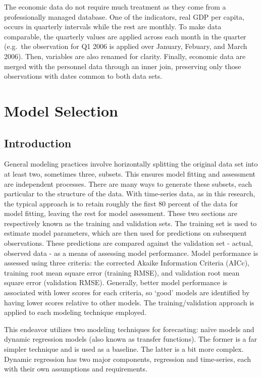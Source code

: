 \documentclass[12pt,letterpaper,toc=flat,oneside]{report}
\theoremstyle{definition}
\theoremstyle{definition}
\theoremstyle{definition}
\theoremstyle{remark}
\begin{document}
The economic data do not require much treatment as they come from a
professionally managed database. One of the indicators, real GDP per
capita, occurs in quarterly intervals while the rest are monthly. To
make data comparable, the quarterly values are applied across each month
in the quarter (e.g.~the observation for Q1 2006 is applied over
January, Febuary, and March 2006). Then, variables are also renamed for
clarity. Finally, economic data are merged with the personnel data
through an inner join, preserving only those observations with dates
common to both data sets.

\hypertarget{model-selection}{%
\section{Model Selection}\label{model-selection}}

\hypertarget{introduction-2}{%
\subsection{Introduction}\label{introduction-2}}

General modeling practices involve horizontally splitting the original
data set into at least two, sometimes three, subsets. This ensures model
fitting and assessment are independent processes. There are many ways to
generate these subsets, each particular to the structure of the data.
With time-series data, as in this research, the typical approach is to
retain roughly the first 80 percent of the data for model fitting,
leaving the rest for model assessment. These two sections are
respectively known as the training and validation sets. The training set
is used to estimate model parameters, which are then used for
predictions on subsequent observations. These predictions are compared
against the validation set - actual, observed data - as a means of
assessing model performance. Model performance is assessed using three
criteria: the corrected Akaike Information Criteria (AICc), training
root mean square error (training RMSE), and validation root mean square
error (validation RMSE). Generally, better model performance is
associated with lower scores for each criteria, so `good' models are
identified by having lower scores relative to other models. The
training/validation approach is applied to each modeling technique
employed.

This endeavor utilizes two modeling techniques for forecasting: naïve
models and dynamic regression models (also known as transfer functions).
The former is a far simpler technique and is used as a baseline. The
latter is a bit more complex. Dynamic regression has two major
components, regression and time-series, each with their own assumptions
and requirements.
\end{document}
